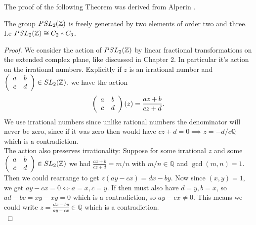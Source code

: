 The proof of the following Theorem was derived from Alperin \citep{alperinpsl}.
\begin{theorem}
The group $PSL_2(\mathbb{Z})$ is freely generated by two elements of order two and three. I.e $PSL_2(\mathbb{Z}) \cong C_2 * C_3$.
\end{theorem}
\begin{proof}
We consider the action of $PSL_2(\mathbb{Z})$ by linear fractional transformations on the extended complex plane, like discussed in Chapter 2. In particular it's action on the irrational numbers. Explicitly if $z$ is an irrational number and $\left(\begin{array}{ c c } a & b \\ c & d \end{array} \right) \in SL_2(\mathbb{Z})$, we have the action 
$$ \left(\begin{array}{ c c } a & b \\ c & d \end{array} \right) (z) = \frac{az + b}{cz +d}.$$
We use irrational numbers since unlike rational numbers the denominator will never be zero, since if it was zero then would have $cz +d = 0 \implies z = -d/c \mathbb{Q}$ which is a contradiction.\\
The action also preserves irrationality: Suppose for some irrational $z$ and some $\left(\begin{array}{ c c } a & b \\ c & d \end{array} \right) \in SL_2(\mathbb{Z})$ we had $\frac{az + b}{cz +d} = m/n$ with $m/n \in \mathbb{Q}$ and $\gcd(m,n) =1$. Then we could rearrange to get 
$z(ay - cx) =  dx - by$. Now since $(x,y) = 1$, we get $ay-cx = 0 \iff a=x, c=y$. If then must also have $d=y,b=x$, so $ad -bc = xy - xy = 0$ which is a contradiction, so $ay - cx \neq 0$. This means we could write $z = \frac{dx -by}{ay -cx} \in \mathbb{Q}$ which is a contradiction.\\


\end{proof}
